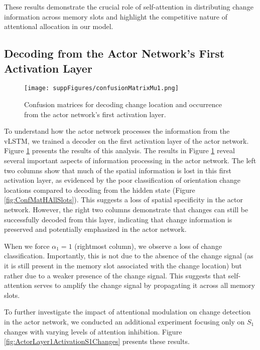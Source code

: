 \documentclass[12pt]{article}
\begin{document}
These results demonstrate the crucial role of self-attention in distributing change information across memory slots and highlight the competitive nature of attentional allocation in our model.

\subsection{Decoding from the Actor Network's First Activation Layer}

\begin{figure}[htbp]
    \centering
    \texttt{[image: suppFigures/confusionMatrixMu1.png]}
    \caption{Confusion matrices for decoding change location and occurrence from the actor network's first activation layer.}
    \label{fig:ActorLayer1Activation}
\end{figure}

To understand how the actor network processes the information from the vLSTM, we trained a decoder on the first activation layer of the actor network. Figure \ref{fig:ActorLayer1Activation} presents the results of this analysis. The results in Figure \ref{fig:ActorLayer1Activation} reveal several important aspects of information processing in the actor network. The left two columns show that much of the spatial information is lost in this first activation layer, as evidenced by the poor classification of orientation change locations compared to decoding from the hidden state (Figure \ref{fig:ConfMatHAllSlots}). This suggests a loss of spatial specificity in the actor network. However, the right two columns demonstrate that changes can still be successfully decoded from this layer, indicating that change information is preserved and potentially emphasized in the actor network.

When we force $\alpha_1=1$ (rightmost column), we observe a loss of change classification. Importantly, this is not due to the absence of the change signal (as it is still present in the memory slot associated with the change location) but rather due to a weaker presence of the change signal. This suggests that self-attention serves to amplify the change signal by propagating it across all memory slots.

To further investigate the impact of attentional modulation on change detection in the actor network, we conducted an additional experiment focusing only on $S_1$ changes with varying levels of attention inhibition. Figure \ref{fig:ActorLayer1ActivationS1Changes} presents these results.
\end{document}
